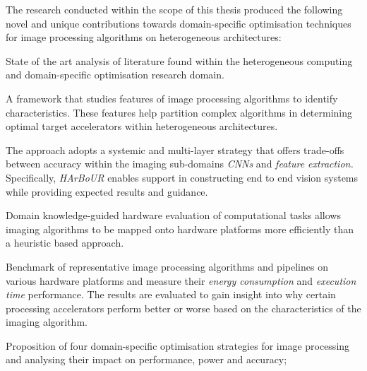 
\let\origdescription\description
\renewenvironment{description}{
  \setlength{\leftmargini}{0em}
  \origdescription
  \setlength{\itemindent}{-1em}
}
{\endlist}
\label{chap:soo}
The research conducted within the scope of this thesis produced the following novel and unique contributions towards domain-specific optimisation techniques for image processing algorithms on heterogeneous architectures:

\begin{description}
  \item[Chapter 3]\hfill
    \begin{description}
       \item[--] State of the art analysis of literature found within the heterogeneous computing and domain-specific optimisation research domain.
    \end{description}
  \item[Chapter 4]\hfill
    \begin{description}
      \item[--] A framework that studies features of image processing algorithms to identify characteristics. These features help partition complex algorithms in determining optimal target accelerators within heterogeneous architectures.
      
      \item[--] The approach adopts a systemic and multi-layer strategy that offers trade-offs between accuracy within the imaging sub-domains \eg \textit{CNNs} and \textit{feature extraction.} Specifically, \textit{HArBoUR} enables support in constructing end to end vision systems while providing expected results and guidance.
      
      \item[--] Domain knowledge-guided hardware evaluation of computational tasks allows imaging algorithms to be mapped onto hardware platforms more efficiently than a heuristic based approach.

       \item[--] Benchmark of representative image processing algorithms and pipelines on various hardware platforms and measure their \emph{energy consumption} and \emph{execution time} performance. The results are evaluated to gain insight into why certain processing accelerators perform better or worse based on the characteristics of the imaging algorithm.
    \end{description}
    \item[Chapter 5]\hfill
    \begin{description}
    \item[--] Proposition of four domain-specific optimisation strategies for image processing and analysing their impact on performance, power and accuracy;
    

\end{description}
\end{description}
